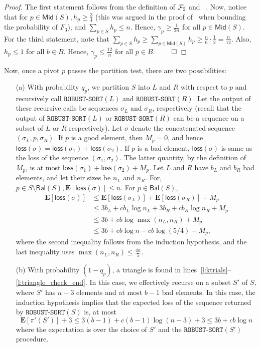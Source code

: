 \documentclass[11pt]{llncs}
\newcommand{\Mid}{{\mathsf{Mid}}}
\newcommand{\Bal}{{\mathsf{Bal}}}
\newcommand{\E}{\mathbf{E}}
\newcommand{\loss}{{\textsf{loss}}}
\newcommand{\RS}{{\texttt{ROBUST-SORT}}}
\begin{document}
\begin{proof}
    The first statement follows from the definition of ${\cal F}_2$ and ~. Now, notice that for $p \in \Mid(S), h_p \geq \frac{3}{4}$ (this was argued in the proof of~ when bounding the probability of $F_3$), and $\sum_{p \in S} h_p \leq n$. Hence, $\gamma_p \geq \frac{1}{2n}$ for all $p \in \Mid(S)$.
    For the third statement, note that $\sum_{p \in S} h_p \geq \sum_{p \in \Mid(S)} h_p \geq \frac{n}{6} \cdot \frac{1}{2} = \frac{n}{12}$. Also, $h_p \leq 1$  for all $b \in B.$ Hence, $\gamma_p \leq \frac{12}{n}$ for all $p \in B$. $\qed$

\end{proof}
 
Now, once a pivot $p$ passes the partition test, there are two possibilities: 
\begin{itemize}
\item[(a)] With probability $q_p$, we partition $S$ into $L$ and $R$ with respect to $p$ and recursively call $\RS(L)$ and $\RS(R)$. Let the output of these recursive calls be sequences $\sigma_L$ and $\sigma_R$, respectively (recall that the output of $\RS(L)$ or $\RS(R)$ can be a sequence on a subset of $L$ or $R$ respectively). Let $\sigma$ denote the concatenated sequence $(\sigma_L, p, \sigma_R)$.  If $p$ is a good element, then $M_p=0$, and hence $\loss(\sigma) = \loss(\sigma_1) + \loss(\sigma_2)$. If $p$ is a bad element, $\loss(\sigma)$ is same as the loss of the sequence $(\sigma_1, \sigma_2)$. The latter quantity, by the definition of $M_p$, is at most $\loss(\sigma_1) + \loss(\sigma_2) + M_p.$ Let $L$ and $R$ have $b_L$ and $b_R$ bad elements, and let their sizes be $n_L$ and $n_R.$ For, $p \in S \setminus \Bal(S), \E[\loss(\sigma)] \leq n$. For $p \in \Bal(S)$, 
    \begin{align*}
        \E[\loss(\sigma)] & \leq \E[\loss(\sigma_L)] + \E[\loss(\sigma_R)] + M_p \\
        & \leq 3b_L + cb_L \log n_L + 3b_R + cb_R \log n_R + M_p \\
        & \leq 3b + c b \log \max(n_L, n_R) + M_p  \\
        &\leq 3b + cb \log n - c b \log(5/4)  +M_p,
    \end{align*}
where the second inequality follows from the induction hypothesis, and the last inequality uses $\max(n_L, n_R) \leq \frac{4n}{5}$.

\item[(b)] With probability $(1-q_p)$, a triangle is found in lines~\ref{l:ktrials}--\ref{l:triangle_check_end}. In this case, we effectively recurse on a subset $S'$ of $S$, where $S'$ has $n-3$ elements and at most $b-1$ bad elements. In this case, the induction hypothesis implies that the expected loss of the sequence returned by $\RS(S)$ is, at most
$$ \E[\pi'(S')] +3 \leq 3(b-1) +  c(b-1) \log (n-3) + 3 \leq 3b + c b \log n$$ where the expectation is over the choice of $S'$ and the $\RS(S')$ procedure. 
\end{itemize}
\end{document}
